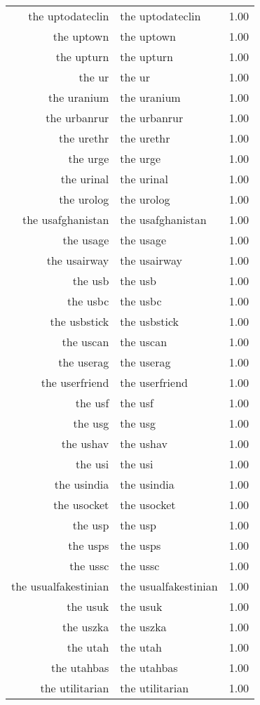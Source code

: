 \begin{table}[ht]
\begin{tabular}{rlr}
  the uptodateclin & the uptodateclin & 1.00 \\ 
  the uptown & the uptown & 1.00 \\ 
  the upturn & the upturn & 1.00 \\ 
  the ur & the ur & 1.00 \\ 
  the uranium & the uranium & 1.00 \\ 
  the urbanrur & the urbanrur & 1.00 \\ 
  the urethr & the urethr & 1.00 \\ 
  the urge & the urge & 1.00 \\ 
  the urinal & the urinal & 1.00 \\ 
  the urolog & the urolog & 1.00 \\ 
  the usafghanistan & the usafghanistan & 1.00 \\ 
  the usage & the usage & 1.00 \\ 
  the usairway & the usairway & 1.00 \\ 
  the usb & the usb & 1.00 \\ 
  the usbc & the usbc & 1.00 \\ 
  the usbstick & the usbstick & 1.00 \\ 
  the uscan & the uscan & 1.00 \\ 
  the userag & the userag & 1.00 \\ 
  the userfriend & the userfriend & 1.00 \\ 
  the usf & the usf & 1.00 \\ 
  the usg & the usg & 1.00 \\ 
  the ushav & the ushav & 1.00 \\ 
  the usi & the usi & 1.00 \\ 
  the usindia & the usindia & 1.00 \\ 
  the usocket & the usocket & 1.00 \\ 
  the usp & the usp & 1.00 \\ 
  the usps & the usps & 1.00 \\ 
  the ussc & the ussc & 1.00 \\ 
  the usualfakestinian & the usualfakestinian & 1.00 \\ 
  the usuk & the usuk & 1.00 \\ 
  the uszka & the uszka & 1.00 \\ 
  the utah & the utah & 1.00 \\ 
  the utahbas & the utahbas & 1.00 \\ 
  the utilitarian & the utilitarian & 1.00 \\ 

\end{tabular}
\end{table}
